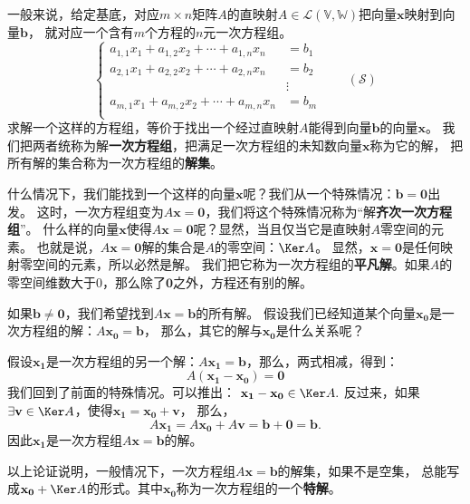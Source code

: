 \documentclass[12pt,UTF8]{ctexbook}
\begin{document}
一般来说，给定基底，对应$m\times n$矩阵$A$的直映射$A \in \mathcal{L}(\mathbb{V}, \mathbb{W})$把向量$\mathbf{x}$映射到向量$\mathbf{b}$，
就对应一个含有$m$个方程的$n$元一次方程组。
$$
\left\{
    \begin{aligned}
        a_{1,1} x_1 + a_{1,2} x_2 + \cdots + a_{1,n} x_n &= b_1 \\
        a_{2,1} x_1 + a_{2,2} x_2 + \cdots + a_{2,n} x_n &= b_2 \\
        &\vdots \\
        a_{m,1} x_1 + a_{m,2} x_2 + \cdots + a_{m,n} x_n &= b_m \\
    \end{aligned}
\right.\qquad (\mathcal{S})
$$
求解一个这样的方程组，等价于找出一个经过直映射$A$能得到向量$\mathbf{b}$的向量$\mathbf{x}$。
我们把两者统称为解\textbf{一次方程组}，把满足一次方程组的未知数向量$\mathbf{x}$称为它的解，
把所有解的集合称为一次方程组的\textbf{解集}。

什么情况下，我们能找到一个这样的向量$\mathbf{x}$呢？我们从一个特殊情况：$\mathbf{b} = \mathbf{0}$出发。
这时，一次方程组变为$A\mathbf{x} = \mathbf{0}$，我们将这个特殊情况称为“解\textbf{齐次一次方程组}”。
什么样的向量$\mathbf{x}$使得$A\mathbf{x} = \mathbf{0}$呢？显然，当且仅当它是直映射$A$零空间的元素。
也就是说，$A\mathbf{x} = \mathbf{0}$解的集合是$A$的零空间：$\Ker A$。
显然，$\mathbf{x} = \mathbf{0}$是任何映射零空间的元素，所以必然是解。
我们把它称为一次方程组的\textbf{平凡解}。如果$A$的零空间维数大于0，那么除了$\mathbf{0}$之外，方程还有别的解。

如果$\mathbf{b} \neq \mathbf{0}$，我们希望找到$A\mathbf{x} = \mathbf{b}$的所有解。
假设我们已经知道某个向量$\mathbf{x_0}$是一次方程组的解：$A\mathbf{x_0} = \mathbf{b}$，
那么，其它的解与$\mathbf{x_0}$是什么关系呢？

假设$\mathbf{x_1}$是一次方程组的另一个解：$A\mathbf{x_1} = \mathbf{b}$，那么，两式相减，得到：
$$A(\mathbf{x_1} - \mathbf{x_0}) = \mathbf{0}$$
我们回到了前面的特殊情况。可以推出：
$ \mathbf{x_1} - \mathbf{x_0} \in \Ker A.$
反过来，如果$\exists \mathbf{v} \in \Ker A$，使得$\mathbf{x_1} = \mathbf{x_0} + \mathbf{v}$，
那么，
$$A\mathbf{x_1} = A\mathbf{x_0} + A\mathbf{v} = \mathbf{b} + \mathbf{0} = \mathbf{b}.$$
因此$\mathbf{x_1}$是一次方程组$A\mathbf{x} = \mathbf{b}$的解。

以上论证说明，一般情况下，一次方程组$A\mathbf{x} = \mathbf{b}$的解集，如果不是空集，
总能写成$\mathbf{x_0} + \Ker A$的形式。其中$\mathbf{x_0}$称为一次方程组的一个\textbf{特解}。
\end{document}
